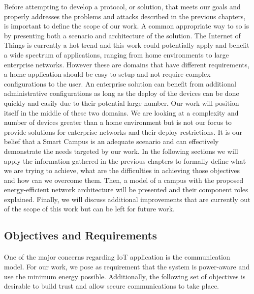 Before attempting to develop a protocol, or solution, that meets our goals and properly addresses the problems and attacks described in the previous chapters, is important to define the scope of our work. A common appropriate way to so is by presenting both a scenario and architecture of the solution. The Internet of Things is currently a hot trend and this work could potentially apply and benefit a wide spectrum of applications, ranging from home environments to large enterprise networks. However these are domains that have different requirements, a home application should be easy to setup and not require complex configurations to the user. An enterprise solution can benefit from additional administrative configurations as long as the deploy of the devices can be done quickly and easily due to their potential large number. Our work will position itself in the middle of these two domains. We are looking at a complexity and number of devices greater than a home environment but is not our focus to provide solutions for enterprise networks and their deploy restrictions. It is our belief that a Smart Campus is an adequate scenario and can effectively demonstrate the needs targeted by our work. In the following sections we will apply the information gathered in the previous chapters to formally define what we are trying to achieve, what are the difficulties in achieving those objectives and how can we overcome them. Then, a model of a campus with the proposed energy-efficient network architecture will be presented and their component roles explained. Finally, we will discuss additional improvements that are currently out of the scope of this work but can be left for future work.

\subsection{Objectives and Requirements}
\paragraph{}
One of the major concerns regarding \ac{IoT} application is the communication model. For our work, we pose as requirement that the system is power-aware and use the minimum energy possible. Additionally, the following set of objectives is desirable to build trust and allow secure communications to take place.

